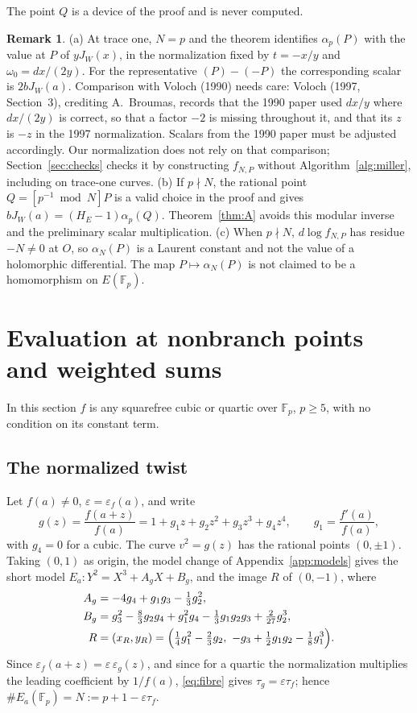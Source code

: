 \documentclass[11pt,a4paper]{article}
\numberwithin{equation}{section}
\theoremstyle{plain}
\theoremstyle{definition}
\newtheorem{remark}[theorem]{Remark}
\newcommand{\F}{\mathbb{F}}
\newcommand{\eps}{\varepsilon}
\begin{document}
The point $Q$ is a device of the proof and is never computed.

\begin{remark}\label{rem:order}
(a) At trace one, $N=p$ and the theorem identifies $\alpha_p(P)$ with the value at $P$ of $yJ_W(x)$, in the normalization fixed by $t=-x/y$ and $\omega_0=dx/(2y)$. For the representative $(P)-(-P)$ the corresponding scalar is $2bJ_W(a)$. Comparison with Voloch (1990) needs care: Voloch (1997, Section~3), crediting A.~Broumas, records that the 1990 paper used $dx/y$ where $dx/(2y)$ is correct, so that a factor $-2$ is missing throughout it, and that its $z$ is $-z$ in the 1997 normalization. Scalars from the 1990 paper must be adjusted accordingly. Our normalization does not rely on that comparison; Section~\ref{sec:checks} checks it by constructing $f_{N,P}$ without Algorithm~\ref{alg:miller}, including on trace-one curves.
(b) If $p\nmid N$, the rational point $Q=[p^{-1}\bmod N]P$ is a valid choice in the proof and gives $bJ_W(a)=(H_E-1)\alpha_p(Q)$. Theorem~\ref{thm:A} avoids this modular inverse and the preliminary scalar multiplication.
(c) When $p\nmid N$, $d\log f_{N,P}$ has residue $-N\neq0$ at $O$, so $\alpha_N(P)$ is a Laurent constant and not the value of a holomorphic differential. The map $P\mapsto\alpha_N(P)$ is not claimed to be a homomorphism on $E(\F_p)$.
\end{remark}

\section{Evaluation at nonbranch points and weighted sums}\label{sec:weighted}

In this section $f$ is any squarefree cubic or quartic over $\F_p$, $p\ge5$, with no condition on its constant term.

\subsection{The normalized twist}
Let $f(a)\neq0$, $\eps=\eps_f(a)$, and write
\begin{equation}\label{eq:g}
g(z)=\frac{f(a+z)}{f(a)}=1+g_1z+g_2z^2+g_3z^3+g_4z^4,\qquad g_1=\frac{f'(a)}{f(a)},
\end{equation}
with $g_4=0$ for a cubic. The curve $v^2=g(z)$ has the rational points $(0,\pm1)$. Taking $(0,1)$ as origin, the model change of Appendix~\ref{app:models} gives the short model $E_a:Y^2=X^3+A_gX+B_g$, and the image $R$ of $(0,-1)$, where
\begin{equation}\label{eq:R}
\begin{aligned}
A_g&=-4g_4+g_1g_3-\tfrac13g_2^2,\\
B_g&=g_3^2-\tfrac83g_2g_4+g_1^2g_4-\tfrac13g_1g_2g_3+\tfrac2{27}g_2^3,\\
R&=(x_R,y_R)=\Bigl(\tfrac14g_1^2-\tfrac23g_2,\ -g_3+\tfrac12g_1g_2-\tfrac18g_1^3\Bigr).
\end{aligned}
\end{equation}
Since $\eps_f(a+z)=\eps\,\eps_g(z)$, and since for a quartic the normalization multiplies the leading coefficient by $1/f(a)$, \eqref{eq:fibre} gives $\tau_g=\eps\tau_f$; hence $\#E_a(\F_p)=N:=p+1-\eps\tau_f$.
\end{document}
